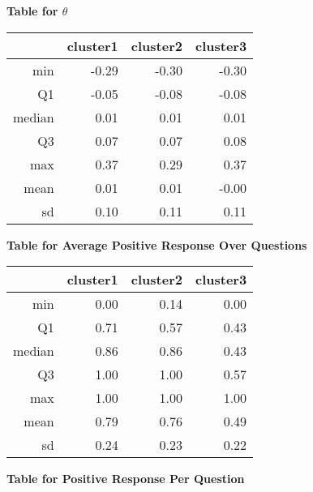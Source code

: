 \documentclass[12pt]{article}
\begin{document}
\newpage



\begin{center}
	\textbf{Table for $\theta$}
\end{center}
\begin{table}[ht]
	\centering
	\begin{tabular}{rrrr}
		\hline
		& cluster1 & cluster2 & cluster3 \\ 
		\hline
		min & -0.29 & -0.30 & -0.30 \\ 
		Q1 & -0.05 & -0.08 & -0.08 \\ 
		median & 0.01 & 0.01 & 0.01 \\ 
		Q3 & 0.07 & 0.07 & 0.08 \\ 
		max & 0.37 & 0.29 & 0.37 \\ 
		mean & 0.01 & 0.01 & -0.00 \\ 
		sd & 0.10 & 0.11 & 0.11 \\ 
		\hline
	\end{tabular}
\end{table}

\begin{center}
	\textbf{Table for Average Positive Response Over Questions}
\end{center}


\begin{table}[ht]
	\centering
	\begin{tabular}{rrrr}
		\hline
		& cluster1 & cluster2 & cluster3 \\ 
		\hline
		min & 0.00 & 0.14 & 0.00 \\ 
		Q1 & 0.71 & 0.57 & 0.43 \\ 
		median & 0.86 & 0.86 & 0.43 \\ 
		Q3 & 1.00 & 1.00 & 0.57 \\ 
		max & 1.00 & 1.00 & 1.00 \\ 
		mean & 0.79 & 0.76 & 0.49 \\ 
		sd & 0.24 & 0.23 & 0.22 \\ 
		\hline
	\end{tabular}
\end{table}


\begin{center}
	\textbf{Table for Positive Response Per Question}
\end{center}
\end{document}
